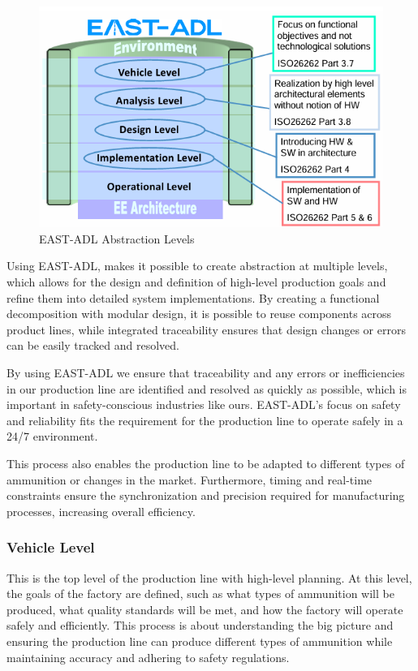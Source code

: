 \begin{figure}[H]
    \centering
    \caption{EAST-ADL Abstraction Levels}
    \label{fig:east-adl-levels}
    \includegraphics[width=1\linewidth]{images/EAST-ADL abstraction levels.png}
\end{figure}

Using EAST-ADL, makes it possible to create abstraction at multiple levels, which allows for the design and definition of high-level production goals and refine them into detailed system implementations. By creating a functional decomposition with modular design, it is possible to reuse components across product lines, while integrated traceability ensures that design changes or errors can be easily tracked and resolved.

By using EAST-ADL we ensure that traceability and any errors or inefficiencies in our production line are identified and resolved as quickly as possible, which is important in safety-conscious industries like ours. EAST-ADL’s focus on safety and reliability fits the requirement for the production line to operate safely in a 24/7 environment.

This process also enables the production line to be adapted to different types of ammunition or changes in the market. Furthermore, timing and real-time constraints ensure the synchronization and precision required for manufacturing processes, increasing overall efficiency.

\subsubsection{Vehicle Level}
This is the top level of the production line with high-level planning. At this level, the goals of the factory are defined, such as what types of ammunition will be produced, what quality standards will be met, and how the factory will operate safely and efficiently. This process is about understanding the big picture and ensuring the production line can produce different types of ammunition while maintaining accuracy and adhering to safety regulations.

